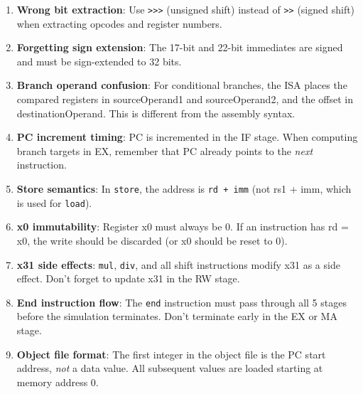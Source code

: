 \documentclass[12pt,a4paper]{article}
\begin{document}
\begin{tcolorbox}[colback=red!5, colframe=red!50!black, title=Common Pitfalls]
\begin{enumerate}
    \item \textbf{Wrong bit extraction}: Use \texttt{>>>} (unsigned shift) instead of \texttt{>>} (signed shift) when extracting opcodes and register numbers.

    \item \textbf{Forgetting sign extension}: The 17-bit and 22-bit immediates are signed and must be sign-extended to 32 bits.

    \item \textbf{Branch operand confusion}: For conditional branches, the ISA places the compared registers in sourceOperand1 and sourceOperand2, and the offset in destinationOperand. This is different from the assembly syntax.

    \item \textbf{PC increment timing}: PC is incremented in the IF stage. When computing branch targets in EX, remember that PC already points to the \emph{next} instruction.

    \item \textbf{Store semantics}: In \texttt{store}, the address is \texttt{rd + imm} (not rs1 + imm, which is used for \texttt{load}).

    \item \textbf{x0 immutability}: Register x0 must always be 0. If an instruction has rd = x0, the write should be discarded (or x0 should be reset to 0).

    \item \textbf{x31 side effects}: \texttt{mul}, \texttt{div}, and all shift instructions modify x31 as a side effect. Don't forget to update x31 in the RW stage.

    \item \textbf{End instruction flow}: The \texttt{end} instruction must pass through all 5 stages before the simulation terminates. Don't terminate early in the EX or MA stage.

    \item \textbf{Object file format}: The first integer in the object file is the PC start address, \emph{not} a data value. All subsequent values are loaded starting at memory address 0.
\end{enumerate}
\end{tcolorbox}

\end{document}
